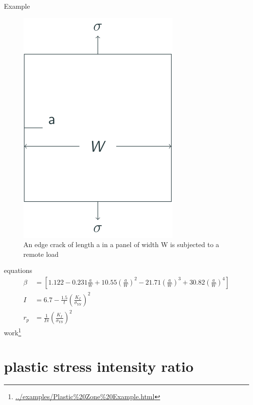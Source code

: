 \documentclass[
  letterpaper,
  ignorenonframetext,
  aspectratio=43,
  handout,
  12pt]{beamer}
\DeclareRobustCommand{\href}[2]{#2\footnote{\url{#1}}}
\let\Oldincludegraphics\includegraphics
\renewcommand{\includegraphics}[2][]{\Oldincludegraphics[width=\textwidth,height=0.7\textheight,keepaspectratio]{#2}}
\begin{document}
\begin{frame}{Example}
\protect\hypertarget{example}{}
\begin{figure}
\centering
\includegraphics{../images/plastic-example.svg}
\caption{An edge crack of length a in a panel of width W is subjected to
a remote load}
\end{figure}
\end{frame}

\begin{frame}{equations}
\protect\hypertarget{equations}{}
\[\begin{aligned}
  \beta &= \left[1.122 - 0.231 \frac{a}{W} + 10.55 \left(\frac{a}{W}\right)^2 - 21.71 \left(\frac{a}{W}\right)^3 + 30.82 \left(\frac{a}{W}\right)^4\right] \\
  I &= 6.7 - \frac{1.5}{t}\left(\frac{K_I}{\sigma_{YS}}\right)^2 \\
  r_p &= \frac{1}{I\pi} \left(\frac{K_I}{\sigma_{YS}}\right)^2
\end{aligned}\] \href{../examples/Plastic\%20Zone\%20Example.html}{work}
\end{frame}

\hypertarget{plastic-stress-intensity-ratio}{%
\section{plastic stress intensity
ratio}\label{plastic-stress-intensity-ratio}}
\end{document}
